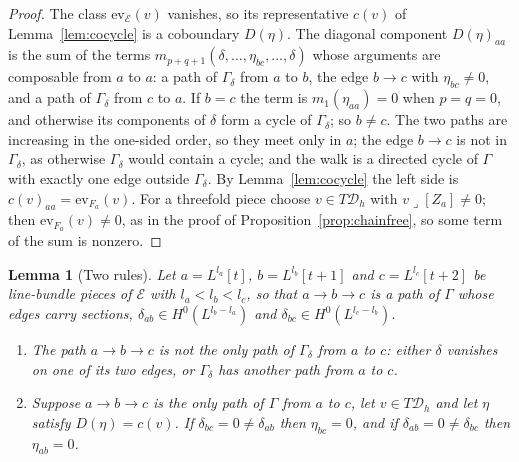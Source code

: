 \documentclass[11pt,reqno]{amsart}
\numberwithin{equation}{section}
\theoremstyle{plain}
\newtheorem{lemma}[theorem]{Lemma}
\theoremstyle{definition}
\newcommand{\cD}{\mathcal{D}}
\begin{document}
\begin{proof}
The class $\mathrm{ev}_{\mathcal{E}}(v)$ vanishes, so its representative $c(v)$ of Lemma~\ref{lem:cocycle} is a coboundary $D(\eta)$. The diagonal component $D(\eta)_{aa}$ is the sum of the terms $m_{p+q+1}(\delta,\dots,\eta_{bc},\dots,\delta)$ whose arguments are composable from $a$ to $a$: a path of $\Gamma_{\delta}$ from $a$ to $b$, the edge $b\to c$ with $\eta_{bc}\ne0$, and a path of $\Gamma_{\delta}$ from $c$ to $a$. If $b=c$ the term is $m_{1}(\eta_{aa})=0$ when $p=q=0$, and otherwise its components of $\delta$ form a cycle of $\Gamma_{\delta}$; so $b\ne c$. The two paths are increasing in the one-sided order, so they meet only in $a$; the edge $b\to c$ is not in $\Gamma_{\delta}$, as otherwise $\Gamma_{\delta}$ would contain a cycle; and the walk is a directed cycle of $\Gamma$ with exactly one edge outside $\Gamma_{\delta}$. By Lemma~\ref{lem:cocycle} the left side is $c(v)_{aa}=\mathrm{ev}_{F_{a}}(v)$. For a threefold piece choose $v\in T\cD_{h}$ with $v\lrcorner[Z_{a}]\ne0$; then $\mathrm{ev}_{F_{a}}(v)\ne0$, as in the proof of Proposition~\ref{prop:chainfree}, so some term of the sum is nonzero.
\end{proof}

\begin{lemma}[Two rules]\label{lem:mcrules}
Let $a=L^{l_{a}}[t]$, $b=L^{l_{b}}[t+1]$ and $c=L^{l_{c}}[t+2]$ be line-bundle pieces of $\mathcal{E}$ with $l_{a}<l_{b}<l_{c}$, so that $a\to b\to c$ is a path of $\Gamma$ whose edges carry sections, $\delta_{ab}\in H^{0}(L^{l_{b}-l_{a}})$ and $\delta_{bc}\in H^{0}(L^{l_{c}-l_{b}})$.
\begin{enumerate}[label=\textup{(\roman*)},leftmargin=2.4em,itemsep=2pt]
\item The path $a\to b\to c$ is not the only path of $\Gamma_{\delta}$ from $a$ to $c$: either $\delta$ vanishes on one of its two edges, or $\Gamma_{\delta}$ has another path from $a$ to $c$.
\item Suppose $a\to b\to c$ is the only path of $\Gamma$ from $a$ to $c$, let $v\in T\cD_{h}$ and let $\eta$ satisfy $D(\eta)=c(v)$. If $\delta_{bc}=0\ne\delta_{ab}$ then $\eta_{bc}=0$, and if $\delta_{ab}=0\ne\delta_{bc}$ then $\eta_{ab}=0$.
\end{enumerate}
\end{lemma}
\end{document}
